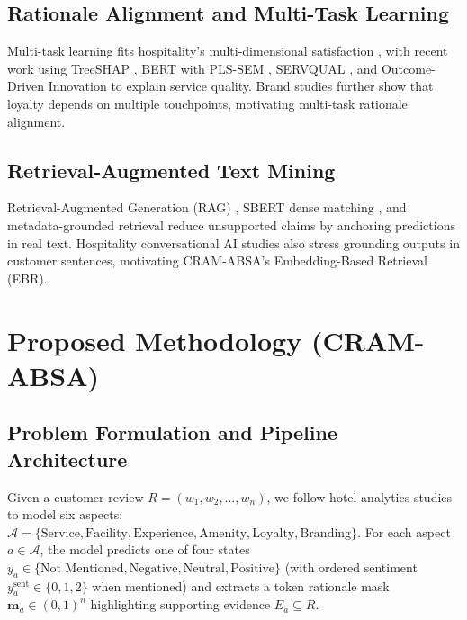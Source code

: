 \documentclass{llncs}
\begin{document}
\subsection{Rationale Alignment and Multi-Task Learning}
\label{subsec:rw_rationale_multitask}
Multi-task learning fits hospitality's multi-dimensional satisfaction \cite{ref06_yu2024,ref13_zhang2022,ref27_alghuribi2025}, with recent work using TreeSHAP \cite{ref16_shin2024}, BERT with PLS-SEM \cite{ref28_xia2026}, SERVQUAL \cite{ref17_perdomo2026}, and Outcome-Driven Innovation \cite{ref12_nam2021} to explain service quality. Brand studies \cite{ref19_tahir2024,ref26_piriyakul2024} further show that loyalty depends on multiple touchpoints, motivating multi-task rationale alignment.

\subsection{Retrieval-Augmented Text Mining}
\label{subsec:rw_retrieval_augmented}
Retrieval-Augmented Generation (RAG) \cite{ref23_lewis2020}, SBERT dense matching \cite{ref24_reimers2019}, and metadata-grounded retrieval \cite{ref02_bruni2025} reduce unsupported claims by anchoring predictions in real text. Hospitality conversational AI studies \cite{ref14_jeong2024,ref22_aransyah2026} also stress grounding outputs in customer sentences, motivating CRAM-ABSA's Embedding-Based Retrieval (EBR).

\section{Proposed Methodology (CRAM-ABSA)}
\label{sec:methodology}

\subsection{Problem Formulation and Pipeline Architecture}
\label{subsec:problem_pipeline}
Given a customer review $R = (w_1, w_2, \dots, w_n)$, we follow hotel analytics studies \cite{ref03_nakamura2021,ref11_sutherland2020} to model six aspects: $\mathcal{A} = \{\text{Service}, \allowbreak \text{Facility}, \allowbreak \text{Experience}, \allowbreak \text{Amenity}, \allowbreak \text{Loyalty}, \allowbreak \text{Branding}\}$. For each aspect $a \in \mathcal{A}$, the model predicts one of four states $y_a \in \{\text{Not Mentioned}, \allowbreak \text{Negative}, \allowbreak \text{Neutral}, \allowbreak \text{Positive}\}$ (with ordered sentiment $y_a^{\text{sent}} \in \{0, 1, 2\}$ when mentioned) and extracts a token rationale mask $\mathbf{m}_a \in (0, 1)^n$ highlighting supporting evidence $E_a \subseteq R$.
\end{document}
